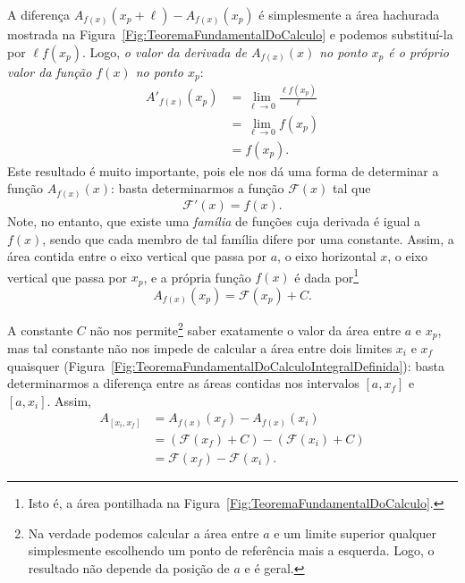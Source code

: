 \noindent{}A diferença $A_{f(x)}(x_p+\ell) - A_{f(x)}(x_p)$ é simplesmente a área hachurada mostrada na Figura~\ref{Fig:TeoremaFundamentalDoCalculo} e podemos substituí-la por $\ell f(x_p)$. Logo, \emph{o valor da derivada de $A_{f(x)}(x)$ no ponto $x_p$ é o próprio valor da função $f(x)$ no ponto $x_p$}:
\begin{align}
  A'_{f(x)}(x_p) &= \lim_{\ell \to 0} \frac{\ell f(x_p)}{\ell} \\
  &= \lim_{\ell \to 0} f(x_p) \\
  &= f(x_p).
\end{align}
%
Este resultado é muito importante, pois ele nos dá uma forma de determinar a função $A_{f(x)}(x)$: basta determinarmos a função $\mathcal{F}(x)$ tal que
\begin{equation}
    \mathcal{F}'(x) = f(x).
\end{equation}
%
Note, no entanto, que existe uma \emph{família} de funções cuja derivada é igual a $f(x)$, sendo que cada membro de tal família difere por uma constante. Assim, a área contida entre o eixo vertical que passa por $a$, o eixo horizontal $x$, o eixo vertical que passa por $x_p$, e a própria função $f(x)$ é dada por\footnote{Isto é, a área pontilhada na Figura~\ref{Fig:TeoremaFundamentalDoCalculo}.}
\begin{equation}
    A_{f(x)}(x_p) = \mathcal{F}(x_p) + C.
\end{equation}
 
A constante $C$ não nos permite\footnote{Na verdade podemos calcular a área entre $a$ e um limite superior qualquer simplesmente escolhendo um ponto de referência mais a esquerda. Logo, o resultado  não depende da posição de $a$ e é geral.} saber exatamente o valor da área entre $a$ e $x_p$, mas tal constante não nos impede de calcular a área entre dois limites $x_i$ e $x_f$ quaisquer (Figura~\ref{Fig:TeoremaFundamentalDoCalculoIntegralDefinida}): basta determinarmos a diferença entre as áreas contidas nos intervalos $[a,x_f]$ e $[a,x_i]$. Assim,
\begin{align}
    A_{[x_i,x_f]} &= A_{f(x)}(x_f) - A_{f(x)}(x_i) \\
    &= (\mathcal{F}(x_f) + C) - (\mathcal{F}(x_i) + C) \\
    &= \mathcal{F}(x_f) - \mathcal{F}(x_i).
\end{align}

